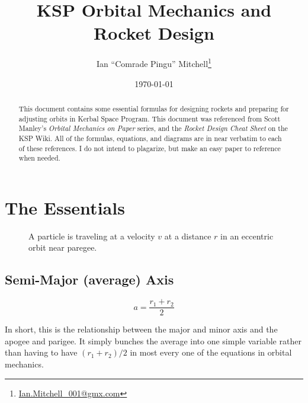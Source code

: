 \documentclass[12pt,a4paper]{article}
\author{Ian ``Comrade Pingu'' Mitchell\footnote{\url{Ian.Mitchell_001@gmx.com}}}
\title{KSP Orbital Mechanics and Rocket Design}
\date{\today}
\numberwithin{equation}{section}
\begin{document}
\maketitle

\begin{abstract}

	This document contains some essential formulas for designing rockets and preparing for adjusting orbits in Kerbal Space Program. This document was referenced from Scott Manley's \textit{Orbital Mechanics on Paper} series, and the \textit{Rocket Design Cheat Sheet} on the KSP Wiki. All of the formulas, equations, and diagrams are in near verbatim to each of these references. I do not intend to plagarize, but make an easy paper to reference when needed.
	
\end{abstract}

\section{The Essentials}

\begin{figure}[h]
	\centering
	\label{fig: 1}
	\caption{A particle is traveling at a velocity $v$ at a distance $r$ in an eccentric orbit near paregee.}
\end{figure}

\subsection{Semi-Major (average) Axis}

\begin{equation}
	a = \frac{r_1 + r_2}{2}
\end{equation}

In short, this is the relationship between the major and minor axis and the apogee and parigee. It simply bunches the average into one simple variable rather than having to have $(r_1 + r_2)/2$ in most every one of the equations in orbital mechanics.
\end{document}
